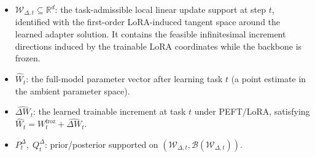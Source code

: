 \documentclass{article}
\begin{document}
\begin{itemize}



\item $\mathcal W_{\Delta,t} \subseteq \mathbb R^d$: the task-admissible local linear update support at step $t$, identified with the first-order LoRA-induced tangent space around the learned adapter solution. It contains the feasible infinitesimal increment directions induced by the trainable LoRA coordinates while the backbone is frozen.


\item $\widehat W_t$: the full-model parameter vector after learning task $t$ (a point estimate in the ambient parameter space).
\item $\widehat{\Delta W}_t$: the learned trainable increment at task $t$ under PEFT/LoRA, satisfying $\widehat W_t = W_t^{\mathrm{froz}} + \widehat{\Delta W}_t$.

 


 
\item $P_t^\Delta,\;Q_t^\Delta$: prior/posterior supported on $(\mathcal W_{\Delta,t},\mathcal B(\mathcal W_{\Delta,t}))$.


\end{itemize}
\end{document}
